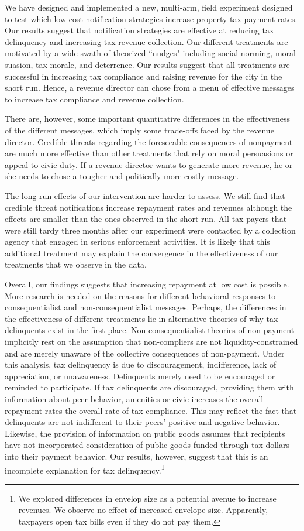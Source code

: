 \documentclass[12pt]{article}
\begin{document}
We have designed and implemented a new, multi-arm, field experiment
designed to test which low-cost notification strategies increase
property tax payment rates. Our results suggest that 
notification strategies are effective at reducing tax delinquency and
increasing tax revenue collection.  Our different treatments are
motivated by a wide swath of theorized ``nudges" including social
norming, moral suasion, tax morale, and deterrence. Our results
suggest that all treatments are successful in increasing tax
compliance and raising revenue for the city in the short run. Hence, a revenue
director can chose from a menu of effective messages to increase
tax compliance and revenue collection.

There are, however, some important quantitative differences in the 
effectiveness of the different messages, which imply some
trade-offs faced by the revenue director. Credible threats regarding the
foreseeable consequences of nonpayment are much more effective than
other treatments that rely on moral persuasions or appeal to civic
duty. If a revenue director wants to generate more revenue, he or she
needs to chose a tougher and politically more costly message. 

The long run effects of our intervention are harder to assess.
We still find that credible threat notifications increase repayment
rates and revenues although the effects are smaller than the ones
observed in the short run.  All tax payers that were still tardy three
months after our experiment were contacted by a collection agency
that engaged in serious enforcement activities. It is likely that this
additional treatment may explain the convergence in the effectiveness
of our treatments that we observe in the data.

Overall, our findings suggests that increasing repayment at low cost
is possible. More research is needed on the reasons for
different behavioral responses to consequentialist and
non-consequentialist messages. Perhaps, the differences in the
effectiveness of different treatments lie in alternative theories of
why tax delinquents exist in the first place. Non-consequentialist
theories of non-payment implicitly rest on the assumption that
non-compliers are not liquidity-constrained and are merely unaware of
the collective consequences of non-payment. Under this analysis, tax
delinquency is due to discouragement, indifference, lack of
appreciation, or unawareness. Delinquents merely need to be encouraged
or reminded to participate. If tax delinquents are discouraged, providing them with information
about peer behavior, amenities or civic increases the overall
repayment rates the overall rate of tax compliance. This may reflect
the fact that delinquents are not indifferent to their peers' positive
and negative behavior. Likewise, the provision of information on
public goods assumes that recipients have not incorporated
consideration of public goods funded through tax dollars into their
payment behavior.  Our results, however, suggest that this is an
incomplete explanation for tax delinquency.\footnote{We explored
  differences in envelop size as a potential avenue to increase
  revenues. We observe no effect of increased envelope size.
  Apparently, taxpayers open tax bills even if they do not pay them.}
\end{document}
